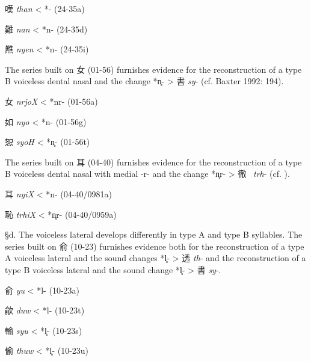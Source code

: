 \begin{description} \item
嘆  \emph{than} \textless{} *{}- (24-35a)
\item
難  \emph{nan} \textless{} *n{}- (24-35d)
\item
㸐  \emph{nyen} \textless{} *n- (24-35i)
\end{description}

The series built on 女 (01-56) furnishes evidence for the reconstruction
of a type B voiceless dental nasal and the change *n̥- \textgreater{} 書
 \emph{sy}- (cf. Baxter 1992: 194).

\begin{description} \item
女  \emph{nrjoX} \textless{} *nr- (01-56a)

\item
如  \emph{nyo} \textless{} *n- (01-56g)

\item
恕  \emph{syoH} \textless{} *n̥- (01-56t)
\end{description}

The series built on 耳 (04-40) furnishes evidence for the reconstruction
of a type B voiceless dental nasal with medial -r- and the change *n̥r-
\textgreater{} 徹~ \emph{trh}- (cf. 
\cite[195-196]{Baxter1992}).

\begin{description} \item
耳  \emph{nyiX} \textless{} *n- (04-40/0981a)

\item
恥  \emph{trhiX} \textless{} *n̥r- (04-40/0959a)
\end{description}

§d. The voiceless lateral develops differently in type A and type B
syllables. The series built on 俞 (10-23) furnishes evidence both for
the reconstruction of a type A voiceless lateral and the sound changes
*l̥{}- \textgreater{} 透 \emph{th}- and the reconstruction of a type B
voiceless lateral and the sound change *l̥- \textgreater{} 書  \emph{sy}-.

\begin{description} \item
俞  \emph{yu} \textless{} *l- (10-23a)

\item
歈  \emph{duw} \textless{} *l{}- (10-23t)

\item
輸  \emph{syu} \textless{} *l̥- (10-23s)

\item
偷  \emph{thuw} \textless{} *l̥{}- (10-23u)
\end{description}

